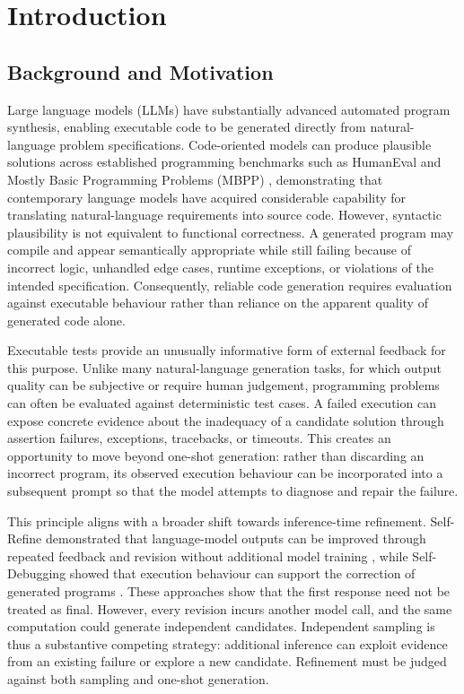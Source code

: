 \chapter{Introduction}

\section{Background and Motivation}

Large language models (LLMs) have substantially advanced automated program synthesis, enabling executable code to be generated directly from natural-language problem specifications. Code-oriented models can produce plausible solutions across established programming benchmarks such as HumanEval and Mostly Basic Programming Problems (MBPP) \citep{chen2021codex,austin2021program}, demonstrating that contemporary language models have acquired considerable capability for translating natural-language requirements into source code. However, syntactic plausibility is not equivalent to functional correctness. A generated program may compile and appear semantically appropriate while still failing because of incorrect logic, unhandled edge cases, runtime exceptions, or violations of the intended specification. Consequently, reliable code generation requires evaluation against executable behaviour rather than reliance on the apparent quality of generated code alone.

Executable tests provide an unusually informative form of external feedback for this purpose. Unlike many natural-language generation tasks, for which output quality can be subjective or require human judgement, programming problems can often be evaluated against deterministic test cases. A failed execution can expose concrete evidence about the inadequacy of a candidate solution through assertion failures, exceptions, tracebacks, or timeouts. This creates an opportunity to move beyond one-shot generation: rather than discarding an incorrect program, its observed execution behaviour can be incorporated into a subsequent prompt so that the model attempts to diagnose and repair the failure.

This principle aligns with a broader shift towards inference-time refinement. Self-Refine demonstrated that language-model outputs can be improved through repeated feedback and revision without additional model training \citep{madaan2023selfrefine}, while Self-Debugging showed that execution behaviour can support the correction of generated programs \citep{chen2023selfdebug}. These approaches show that the first response need not be treated as final. However, every revision incurs another model call, and the same computation could generate independent candidates. Independent sampling is thus a substantive competing strategy: additional inference can exploit evidence from an existing failure or explore a new candidate. Refinement must be judged against both sampling and one-shot generation.

